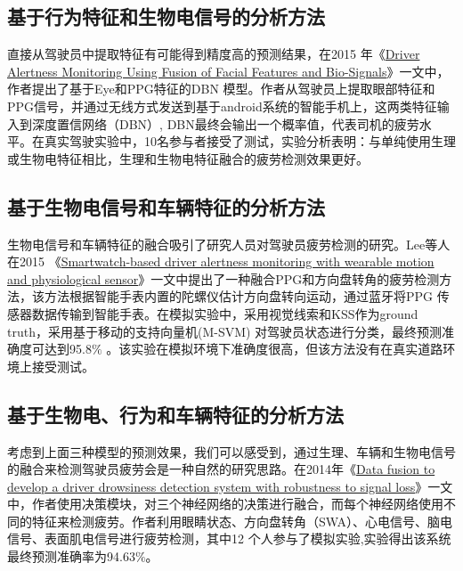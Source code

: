 \subsection{基于行为特征和生物电信号的分析方法}

直接从驾驶员中提取特征有可能得到精度高的预测结果，在2015 年《\href{https://xueshu.baidu.com/usercenter/paper/show?paperid=18ca7cad0c2f50c8fd84edb4cf68228e&site=xueshu_se&hitarticle=1}{Driver Alertness Monitoring Using Fusion of Facial Features and Bio-Signals}》一文中，作者提出了基于Eye和PPG特征的DBN 模型。作者从驾驶员上提取眼部特征和PPG信号，并通过无线方式发送到基于android系统的智能手机上，这两类特征输入到深度置信网络（DBN）, DBN最终会输出一个概率值，代表司机的疲劳水平。在真实驾驶实验中，10名参与者接受了测试，实验分析表明：与单纯使用生理或生物电特征相比，生理和生物电特征融合的疲劳检测效果更好。

\subsection{基于生物电信号和车辆特征的分析方法}

生物电信号和车辆特征的融合吸引了研究人员对驾驶员疲劳检测的研究。Lee等人在2015 《\href{https://xueshu.baidu.com/usercenter/paper/show?paperid=7515e7f9ea210a19031c7d2779900c36&site=xueshu_se}{Smartwatch-based driver alertness monitoring with wearable motion and physiological sensor}》一文中提出了一种融合PPG和方向盘转角的疲劳检测方法，该方法根据智能手表内置的陀螺仪估计方向盘转向运动，通过蓝牙将PPG 传感器数据传输到智能手表。在模拟实验中，采用视觉线索和KSS作为ground truth，采用基于移动的支持向量机(M-SVM) 对驾驶员状态进行分类，最终预测准确度可达到95.8$\%$ 。该实验在模拟环境下准确度很高，但该方法没有在真实道路环境上接受测试。

\subsection{基于生物电、行为和车辆特征的分析方法}

考虑到上面三种模型的预测效果，我们可以感受到，通过生理、车辆和生物电信号的融合来检测驾驶员疲劳会是一种自然的研究思路。在2014年《\href{https://xueshu.baidu.com/usercenter/paper/show?paperid=8b16b46bd02a42af28065c279838ef5b&site=xueshu_se&hitarticle=1}{Data
fusion to develop a driver drowsiness detection system with robustness to signal loss}》一文中，作者使用决策模块，对三个神经网络的决策进行融合，而每个神经网络使用不同的特征来检测疲劳。作者利用眼睛状态、方向盘转角（SWA）、心电信号、脑电信号、表面肌电信号进行疲劳检测，其中12 个人参与了模拟实验,实验得出该系统最终预测准确率为94.63$\%$。

